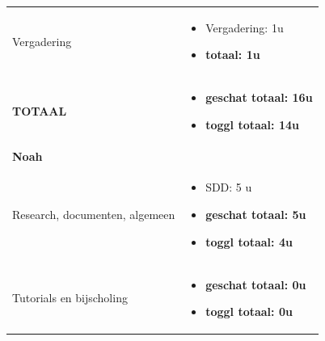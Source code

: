 \documentclass{article}
\begin{document}
\begin{center}
\begin{tabularx}{\textwidth}[t]{XX}
\arrayrulecolor{black}\hline

\vspace{2 mm}
Vergadering & 
\begin{minipage}[t]{\linewidth}%
\vspace{2 mm}
\begin{itemize}
\item Vergadering: 1u
\item \textbf{totaal: 1u}
\vspace{2 mm}
\end{itemize} 
\end{minipage}\\

\arrayrulecolor{black}\hline

\vspace{2 mm}
\textbf{TOTAAL} & 
\begin{minipage}[t]{\linewidth}%
\vspace{2 mm}
\begin{itemize}
\item \textbf{geschat totaal: 16u}
\item \textbf{toggl totaal: 14u}
\vspace{2 mm}
\end{itemize} 
\end{minipage}\\



\arrayrulecolor{green}\hline
\vspace{.1 mm}
\textbf{\textcolor{myGreen}{\large{Noah}}} \vspace{.1 mm} & \\
\hline
\vspace{1 mm}
Research, documenten, algemeen & 
\begin{minipage}[t]{\linewidth}%
\vspace{1 mm}
\begin{itemize}
\item SDD: 5 u
\item \textbf{geschat totaal: 5u}
\item \textbf{toggl totaal: 4u}
\end{itemize} 
\vspace{1 mm}
\end{minipage}\\

\arrayrulecolor{black}\hline

\vspace{1 mm}
Tutorials en bijscholing & 
\begin{minipage}[t]{\linewidth}%
\vspace{1 mm}
\begin{itemize}
\item \textbf{geschat totaal: 0u}
\item \textbf{toggl totaal: 0u}
\end{itemize} 
\vspace{1 mm}
\end{minipage}\\


\end{tabularx}
\end{center}
\end{document}
